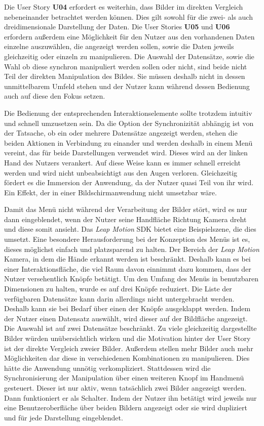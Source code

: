 Die User Story \textbf{U04} erfordert es weiterhin, dass Bilder im direkten Vergleich nebeneinander betrachtet werden können. Dies gilt sowohl für die zwei- als auch dreidimensionale Darstellung der Daten. Die User Stories \textbf{U05} und \textbf{U06} erfordern außerdem eine Möglichkeit für den Nutzer aus den vorhandenen Daten einzelne auszuwählen, die angezeigt werden sollen, sowie die Daten jeweils gleichzeitig oder einzeln zu manipulieren. 
Die Auswahl der Datensätze, sowie die Wahl ob diese synchron manipuliert werden sollen oder nicht, sind beide nicht Teil der direkten Manipulation des Bildes. Sie müssen deshalb nicht in dessen unmittelbarem Umfeld stehen und der Nutzer kann während dessen Bedienung auch auf diese den Fokus setzen.
 
Die Bedienung der entsprechenden Interaktionselemente sollte trotzdem intuitiv und schnell umzusetzen sein. Da die Option der Synchronizität abhängig ist von der Tatsache, ob ein oder mehrere Datensätze angezeigt werden, stehen die beiden Aktionen in Verbindung zu einander und werden deshalb in einem Menü vereint, das für beide Darstellungen verwendet wird. Dieses wird an der linken Hand des Nutzers verankert. Auf diese Weise kann es immer schnell erreicht werden und wird nicht unbeabsichtigt aus den Augen verloren. Gleichzeitig fördert es die Immersion der Anwendung, da der Nutzer quasi Teil von ihr wird. Ein Effekt, der in einer Bildschirmanwendung nicht umsetzbar wäre. 

Damit das Menü nicht während der Verarbeitung der Bilder stört, wird es nur dann eingeblendet, wenn der Nutzer seine Handfläche Richtung Kamera dreht und diese somit ansieht. Das \textit{Leap Motion} SDK bietet eine Beispielszene, die dies umsetzt.
Eine besondere Herausforderung bei der Konzeption des Menüs ist es, dieses möglichst einfach und platzsparend zu halten. Der Bereich der \textit{Leap Motion} Kamera, in dem die Hände erkannt werden ist beschränkt. Deshalb kann es bei einer Interaktionsfläche, die viel Raum davon einnimmt dazu kommen, dass der Nutzer versehentlich Knöpfe betätigt. 
Um den Umfang des Menüs in benutzbaren Dimensionen zu halten, wurde es auf drei Knöpfe reduziert. 
Die Liste der verfügbaren Datensätze kann darin allerdings nicht untergebracht werden. Deshalb kann sie bei Bedarf über einen der Knöpfe ausgeklappt werden. 
Indem der Nutzer einen Datensatz auswählt, wird dieser auf der Bildfläche angezeigt. Die Auswahl ist auf zwei Datensätze beschränkt. Zu viele gleichzeitig dargestellte Bilder würden unübersichtlich wirken und die Motivation hinter der User Story ist der direkte Vergleich zweier Bilder. Außerdem stellen mehr Bilder auch mehr Möglichkeiten dar diese in verschiedenen Kombinationen zu manipulieren. Dies hätte die Anwendung unnötig verkompliziert. 
Stattdessen wird die Synchronisierung der Manipulation über einen weiteren Knopf im Handmenü gesteuert. Dieser ist nur aktiv, wenn tatsächlich zwei Bilder angezeigt werden. Dann funktioniert er als Schalter. Indem der Nutzer ihn betätigt wird jeweils nur eine Benutzeroberfläche über beiden Bildern angezeigt oder sie wird dupliziert und für jede Darstellung eingeblendet. 
 
